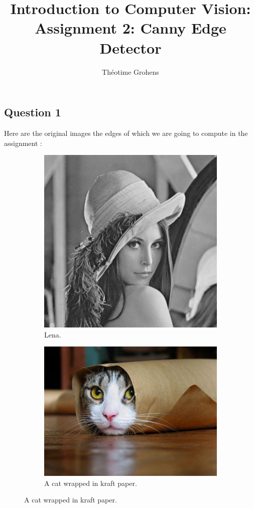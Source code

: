 \documentclass[a4paper]{article}
\author{Théotime Grohens}
\title{Introduction to Computer Vision: \\ Assignment 2: Canny Edge Detector}
\begin{document}
\maketitle

\subsection*{Question 1}

Here are the original images the edges of which we are going to compute in the assignment :

\begin{figure}[h]
\centering

\begin{subfigure}{0.49\textwidth}
\includegraphics[width=\textwidth]{lena.jpg}
\caption{Lena.}
\end{subfigure} 
\begin{subfigure}{0.49\textwidth}
\includegraphics[width=\textwidth]{cat.jpg}
\caption{A cat wrapped in kraft paper.}
\end{subfigure}
\end{figure}
\end{document}

